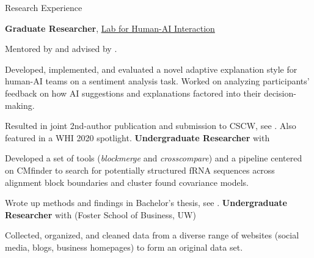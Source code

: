 \begin{rubric}{Research Experience}

	\textbf{Graduate Researcher}, \href{http://hai.cs.washington.edu}{Lab for Human-AI Interaction}
	\par Mentored by \pBansalG{} and advised by \pWeldD{}.
	\par Developed, implemented, and evaluated a novel adaptive explanation style for human-AI teams on a sentiment analysis task. Worked on analyzing participants' feedback on how AI suggestions and explanations factored into their decision-making.
	\par Resulted in joint 2nd-author publication and submission to CSCW, see \cite{bansal2020does}. Also featured in a WHI 2020 spotlight.
\entry*[2018 -- 2019] %
    \textbf{Undergraduate Researcher} with \pRuzzoL{}
    \par Developed a set of tools (\textit{blockmerge} and \textit{crosscompare}) and a pipeline centered on CMfinder to search for potentially structured fRNA sequences across alignment block boundaries and cluster found covariance models.
    \par Wrote up methods and findings in Bachelor's thesis, see \cite{zhou2019thesis}.
\entry*[2018 -- 2019] %
	\textbf{Undergraduate Researcher} with \pPahnkeE{} (Foster School of Business, UW)
	\par Collected, organized, and cleaned data from a diverse range of websites (social media, blogs, business homepages) to form an original data set.
\end{rubric}